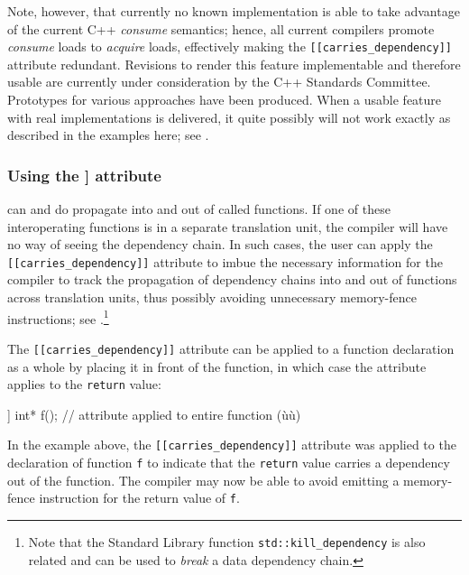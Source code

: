 Note, however, that currently no known implementation is able to take
advantage of the current C++ \emph{consume} semantics; hence, all
current compilers promote \emph{consume} loads to \emph{acquire} loads,
effectively making the \lstinline![[carries_dependency]]! attribute
redundant. Revisions to render this feature implementable and therefore
usable are currently under consideration by the C++ Standards Committee.
Prototypes for various approaches have been produced. When a usable
feature with real implementations is delivered, it quite possibly will
not work exactly as described in the examples here; see . 

\subsubsection[Using the {\protect\lstinline![[carries_dependency]]!} attribute]{Using the {\SubsubsecCode [[carries\_dependency]]} attribute}\label{using-the-[[carries_dependency]]-attribute}

 can and do propagate into and out of
called functions. If one of these interoperating functions is in a
separate translation unit, the compiler will have no way of seeing the
dependency chain. In such cases, the user can apply the
\lstinline![[carries_dependency]]! attribute to imbue the necessary
information for the compiler to track the propagation of dependency
chains into and out of functions across translation units, thus possibly
avoiding unnecessary memory-fence instructions; see .{\cprotect\footnote{Note that the Standard Library function
\lstinline!std::kill_dependency! is also related and can be used to
  \emph{break} a data dependency chain.}} 

The \lstinline![[carries_dependency]]! attribute can be applied to a
function declaration as a whole by placing it in front of the function,
in which case the attribute applies to the \lstinline!return! value:

\begin{emcppslisting}[language=C++]
[[carries_dependency]] int* f();  // attribute applied to entire function (ù{}ù)
\end{emcppslisting}
    
\noindent In the example above, the \lstinline![[carries_dependency]]! attribute was
applied to the declaration of function \lstinline!f! to indicate that the
\lstinline!return! value carries a dependency out of the function. The
compiler may now be able to avoid emitting a memory-fence instruction
for the return value of \lstinline!f!.

